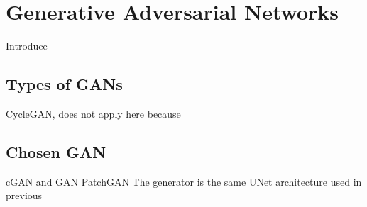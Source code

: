 \chapter{Generative Adversarial Networks}
Introduce

\section{Types of GANs} 
CycleGAN, does not apply here because

\section{Chosen GAN}
cGAN and GAN
PatchGAN
The generator is the same UNet architecture used in previous

